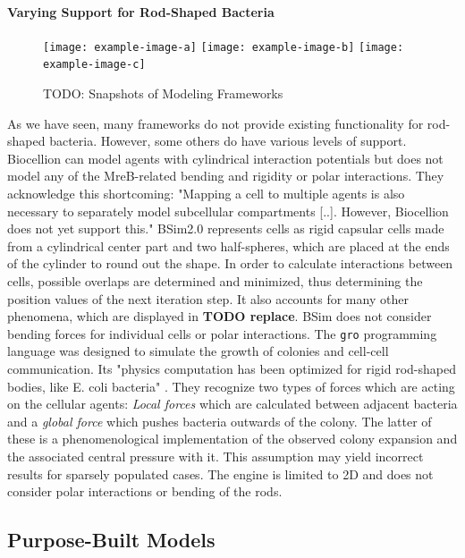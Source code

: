 \documentclass{article}
\begin{document}
\paragraph{Varying Support for Rod-Shaped Bacteria}

\begin{figure}[H]
    \centering
    \texttt{[image: example-image-a]}
    \texttt{[image: example-image-b]}
    \texttt{[image: example-image-c]}
    \caption{TODO: Snapshots of Modeling Frameworks}
\end{figure}

As we have seen, many frameworks do not provide existing functionality for rod-shaped bacteria.
However, some others do have various levels of support.
Biocellion \cite{Kang2014} can model agents with cylindrical interaction potentials but does not
model any of the MreB-related bending and rigidity or polar interactions.
They acknowledge this shortcoming: "Mapping a cell to multiple agents is also necessary to
separately model subcellular compartments [..].
However, Biocellion does not yet support this." \cite{Kang2014}
BSim2.0 represents cells as rigid capsular cells made from a cylindrical center part and two
half-spheres, which are placed at the ends of the cylinder to round out the shape.
In order to calculate interactions between cells, possible overlaps are determined and minimized,
thus determining the position values of the next iteration step.
It also accounts for many other phenomena, which are displayed in \textbf{TODO replace}.
BSim does not consider bending forces for individual cells or polar interactions.
The \texttt{gro} programming language was designed to simulate the growth of colonies and cell-cell
communication.
Its "physics computation has been optimized for rigid rod-shaped bodies, like E. coli bacteria"
\cite{Gutirrez2017}.
They recognize two types of forces which are acting on the cellular agents:
\textit{Local forces} which are calculated between adjacent bacteria and a \textit{global force}
which pushes bacteria outwards of the colony.
The latter of these is a phenomenological implementation of the observed colony expansion and the
associated central pressure with it.
This assumption may yield incorrect results for sparsely populated cases.
The engine is limited to 2D and does not consider polar interactions or bending of the rods.

\subsection{Purpose-Built Models}
\end{document}
